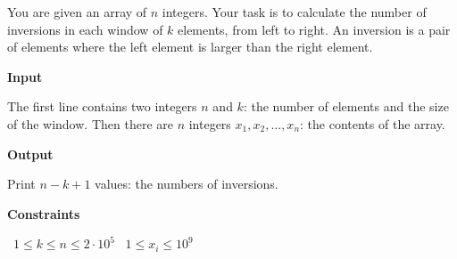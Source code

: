 You are given an array of $n$ integers. Your task is to calculate the number of inversions in each window of $k$ elements, from left to right.
An inversion is a pair of elements where the left element is larger than the right element.

\vspace{0.3cm}\noindent\textbf{Input}

The first line contains two integers $n$ and $k$: the number of elements and the size of the window.
Then there are $n$ integers $x_1,x_2,\ldots,x_n$: the contents of the array.

\vspace{0.3cm}\noindent\textbf{Output}

Print $n-k+1$ values: the numbers of inversions.

\vspace{0.3cm}\noindent\textbf{Constraints}

\textbullet\ $1 \le k \le n \le 2 \cdot 10^5$
\textbullet\ $1 \le x_i \le 10^9$
